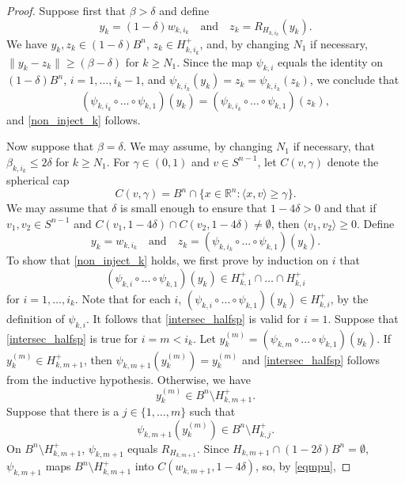 \documentclass[12pt,reqno]{amsart}
\newcommand{\R}{{\mathbb R}}
\numberwithin{equation}{section}
\begin{document}
\begin{proof}
Suppose first that $\beta>\delta$ and define
\[
y_k=(1-\delta)w_{k,i_k}\quad\text{and}\quad z_k=R_{H_{k,i_k}}(y_k).
\]
We have $y_k, z_k\in (1-\delta) B^n$, $z_k\in H_{k,i_k}^+$, and, by changing $N_1$ if necessary, $\|y_k-z_k\|\geq (\beta-\delta)$ for $k\ge N_1$. Since the map $\psi_{k,i}$ equals the identity on $(1-\delta) B^n$, $i=1,\dots,i_k-1$, and $ \psi_{k,i_k}(y_k)=z_k=\psi_{k,i_k}(z_k)$, we conclude that
\begin{equation}\label{non_inject_ik}
(\psi_{k,i_k}\circ\dots\circ \psi_{k,1})(y_k)=(\psi_{k,i_k}\circ\dots\circ \psi_{k,1})(z_k),
\end{equation}
and \eqref{non_inject_k} follows.

Now suppose that $\beta=\delta$. We may assume, by changing $N_1$ if necessary, that $\beta_{k,i_k}\leq 2\delta$ for $k\ge N_1$.
For $\gamma\in(0,1)$ and $v\in S^{n-1}$, let $C(v,\gamma)$ denote the spherical cap
\[
 C(v,\gamma)=B^n\cap\{x\in \R^n : \langle x,v\rangle \geq \gamma\}.
\]
We may assume that $\delta$ is small enough to ensure that $1-4\delta>0$ and that if $v_1, v_2\in S^{n-1}$ and $C(v_1,1-4\delta)\cap C(v_2,1-4\delta)\neq \emptyset$, then $\langle v_1,v_2\rangle\geq 0$.
Define
\[
y_k=w_{k,i_k}\quad\text{and}\quad z_k=(\psi_{k,i_k}\circ\dots\circ\psi_{k,1})(y_k).
\]
To show that \eqref{non_inject_k} holds, we first prove by induction on $i$ that
\begin{equation}\label{intersec_halfsp}
(\psi_{k,i}\circ\dots\circ\psi_{k,1})(y_k)\in H_{k,1}^+\cap \dots \cap H_{k,i}^+
\end{equation}
for $i=1,\dots,i_k$.  Note that for each $i$, $(\psi_{k,i}\circ\dots\circ\psi_{k,1})(y_k)\in H_{k,i}^+$, by the definition of $\psi_{k,i}$. It follows that \eqref{intersec_halfsp} is valid for $i=1$.  Suppose that \eqref{intersec_halfsp} is true for $i=m<i_k$. Let $y_k^{(m)}=(\psi_{k,m}\circ\dots\circ\psi_{k,1})(y_k)$. If $y_k^{(m)}\in H_{k,m+1}^+$, then $\psi_{k,m+1}(y_k^{(m)})=y_k^{(m)}$ and \eqref{intersec_halfsp} follows from the inductive hypothesis.  Otherwise, we have
\begin{equation}\label{eqmpu}
 y_k^{(m)}\in B^n\setminus H_{k,m+1}^+.
\end{equation}
Suppose that there is a $j\in\{1,\dots,m\}$ such that
\begin{equation}\label{eqmi}
\psi_{k,m+1}(y_k^{(m)})\in B^n\setminus H_{k,j}^+.
\end{equation}
On $B^n\setminus H_{k,m+1}^+$, $\psi_{k,m+1}$ equals $R_{H_{k,m+1}}$. Since  $H_{k,m+1}\cap(1-2\delta) B^n=\emptyset$, $\psi_{k,m+1}$ maps $B^n\setminus H_{k,m+1}^+$ into $C(w_{k,m+1}, 1-4\delta)$, so, by  \eqref{eqmpu},

\end{proof}
\end{document}

